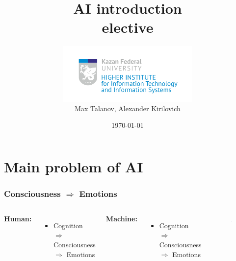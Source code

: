 \documentclass[12pt, aspectratio=169]{beamer}
\title[AI intro]{AI introduction \\elective} %
\author[Max Talanov, Alexander Kirilovich]{
  \includegraphics[height=3cm]{ITIS_logo_bright}\\
  Max Talanov, Alexander Kirilovich
}
\institute[ITIS: KFU] %
{
Machine cognition lab, Intellectual robotics department, ITIS \\ %
\medskip
\textit{max.talanov@gmail.com} %
}
\date{\today} %
\begin{document}
\begin{frame}
\titlepage %
\end{frame}



\section{Main problem of AI} %

\begin{frame}
\frametitle{Consciousness $\Rightarrow$ Emotions}
\begin{columns}[c] %

\textbf{Human:}
\begin{itemize}
\item Cognition $\Rightarrow$ Consciousness $\Rightarrow$ Emotions
\end{itemize}

\textbf{Machine:}
\begin{itemize}
\item Cognition $\Rightarrow$ Consciousness $\Rightarrow$ Emotions
\end{itemize}

\begin{figure}
\includegraphics[width=0.8\linewidth]{Kismet_312}
\end{figure}
\end{columns}
\end{frame}
\end{document}
